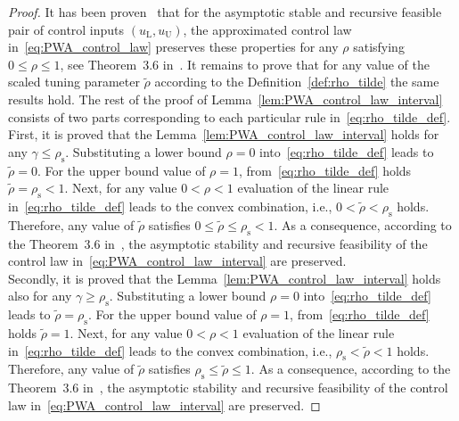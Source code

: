 \documentclass[preprint,12pt]{elsarticle}
\begin{document}
	\begin{proof}
		\label{proof:rho_tilde}
		It has been proven~\cite{Oravec_tunable} that for the asymptotic stable and recursive feasible pair of control inputs $(u_{\mathrm{L}}, u_{\mathrm{U}})$, the approximated control law in~\eqref{eq:PWA_control_law} preserves these properties for any $\rho$ satisfying $0 \leq \rho \leq 1$, see Theorem~3.6 in~\cite{Oravec_tunable}. 
		It remains to prove that for any value of the scaled tuning parameter $\widetilde{\rho}$ according to the Definition~\ref{def:rho_tilde} the same results hold. 
		The rest of the proof of Lemma~\ref{lem:PWA_control_law_interval} consists of two parts corresponding to each particular rule in~\eqref{eq:rho_tilde_def}. 
		\\
		First, it is proved that the Lemma~\ref{lem:PWA_control_law_interval} holds for any $\gamma \leq \rho_{\mathrm{s}}$. Substituting a lower bound $\rho=0$ into~\eqref{eq:rho_tilde_def} leads to
		$\widetilde{\rho} = 0$. 
		For the upper bound value of $\rho=1$, from~\eqref{eq:rho_tilde_def} holds $\widetilde{\rho} = \rho_{\mathrm{s}} < 1$. Next, for any value $0 < \rho < 1$ evaluation of the linear rule in~\eqref{eq:rho_tilde_def} leads to the convex combination, i.e., $0 < \widetilde{\rho} < \rho_{\mathrm{s}} $ holds. 
		Therefore, any value of $\widetilde{\rho}$ satisfies $0 \leq \widetilde{\rho} \leq \rho_{\mathrm{s}} < 1$. As a consequence, according to the Theorem~3.6 in~\cite{Oravec_tunable}, the asymptotic stability and recursive feasibility of the control law in~\eqref{eq:PWA_control_law_interval} are preserved. 
		\\
		Secondly, it is proved that the Lemma~\ref{lem:PWA_control_law_interval} holds also for any $\gamma \geq \rho_{\mathrm{s}}$. Substituting a lower bound $\rho=0$ into~\eqref{eq:rho_tilde_def} leads to
		$\widetilde{\rho} = \rho_{\mathrm{s}}$. 
		For the upper bound value of $\rho=1$, from~\eqref{eq:rho_tilde_def} holds $\widetilde{\rho} = 1$. Next, for any value $0 < \rho < 1$ evaluation of the linear rule in~\eqref{eq:rho_tilde_def} leads to the convex combination, i.e., $\rho_{\mathrm{s}} < \widetilde{\rho} < 1 $ holds. 
		Therefore, any value of $\widetilde{\rho}$ satisfies $\rho_{\mathrm{s}} \leq \widetilde{\rho} \leq 1$. As a consequence, according to the Theorem~3.6 in~\cite{Oravec_tunable}, the asymptotic stability and recursive feasibility of the control law in~\eqref{eq:PWA_control_law_interval} are preserved. 
	\end{proof}
	
\end{document}
